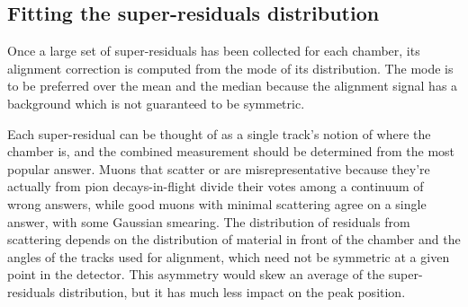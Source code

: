 \documentclass[12pt]{article}
\begin{document}
\subsection{Fitting the super-residuals distribution}
\label{sec:fitting}

Once a large set of super-residuals has been collected for each
chamber, its alignment correction is computed from the mode of its
distribution.  The mode is to be preferred over the mean and
the median because the alignment signal has a background which is not
guaranteed to be symmetric.

Each super-residual can be thought of as a single track's notion of
where the chamber is, and the combined measurement should be
determined from the most popular answer.  Muons that scatter or are
misrepresentative because they're actually from pion decays-in-flight
divide their votes among a continuum of wrong answers, while good
muons with minimal scattering agree on a single answer, with some
Gaussian smearing.  The distribution of residuals from scattering
depends on the distribution of material in front of the chamber and
the angles of the tracks used for alignment, which need not be
symmetric at a given point in the detector.  This asymmetry would skew
an average of the super-residuals distribution, but it has much less
impact on the peak position.
\end{document}
